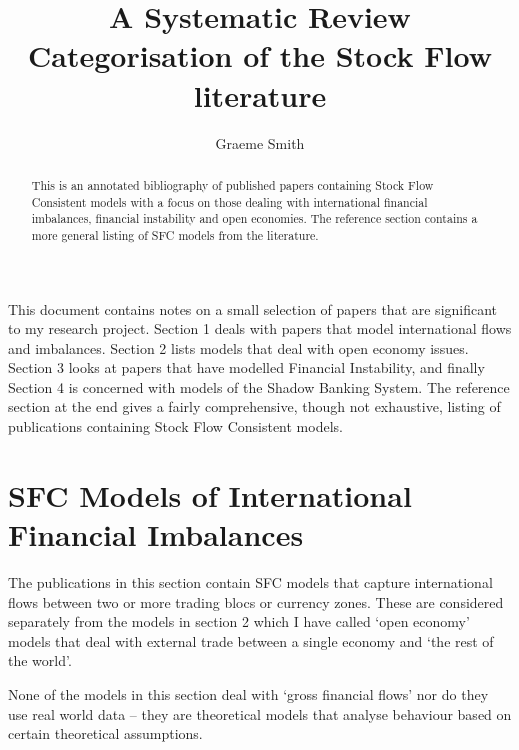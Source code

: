 \documentclass[twoside,a4paper,11pt]{article}
\title{A Systematic Review Categorisation of the Stock Flow literature}
\author{Graeme Smith}
\begin{document}
\maketitle
\begin{abstract} This is an annotated bibliography of published papers containing Stock Flow Consistent models with a focus on those dealing with international financial imbalances, financial instability and open economies. The   reference section contains a more general listing of SFC models from the literature.
\end{abstract}

This document contains notes on a small selection of papers that are significant to my research project. Section 1 deals with papers that model international flows and imbalances. Section 2 lists models that deal with open economy issues. Section 3 looks at papers that have modelled Financial Instability, and finally Section 4 is concerned with models of the Shadow Banking System. The reference section at the end gives a fairly comprehensive, though not exhaustive, listing of publications containing Stock Flow Consistent models.

\section{SFC Models of International Financial Imbalances}
The publications in this section contain SFC models that capture international flows between two or more trading blocs or currency zones. These are considered separately from the models in section 2 which I have called `open economy' models that deal with external trade between a single economy and `the rest of the world'.

None of the models in this section deal with `gross financial flows' nor do they use real world data -- they are theoretical models that analyse behaviour based on certain theoretical assumptions.\\  
  
\end{document}
